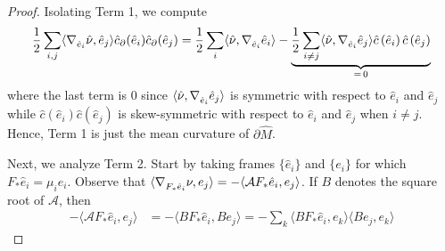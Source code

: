 \documentclass[10pt,a4paper]{amsart}
\newcommand{\bnd}[1]{\partial #1}
\newcommand{\cbar}[1]{\dom{c}\left(#1\right)}
\newcommand{\dom}[1]{\hat{#1}}
\newcommand{\inner}[1]{\langle #1 \rangle}
\begin{document}
\begin{proof}
    Isolating Term 1, we compute
    \begin{equation*}
        \frac{1}{2} \sum_{i, j} \inner{\conn[]_{\dom{e}_i} \dom{\nu}, \dom{e}_j} \dom{c}_\partial(\dom{e}_i) \dom{c}_\partial(\dom{e}_j) = \frac{1}{2} \sum_i \inner{\dom{\nu}, \conn[]_{\dom{e}_i} \dom{e}_i} - \underbrace{\frac{1}{2} \sum_{i \neq j} \inner{\dom{\nu}, \conn[]_{\dom{e}_i} \dom{e}_j} \cbar{\dom{e}_i} \cbar{\dom{e}_j}}_{=\, 0}
    \end{equation*}
    where the last term is 0 since \(\inner{\dom{\nu}, \conn[]_{\dom{e}_i} \dom{e}_j}\) is symmetric with respect to \(\dom{e}_i\) and \(\dom{e}_j\) while \(\cbar{\dom{e}_i} \cbar{\dom{e}_j}\) is skew-symmetric with respect to \(\dom{e}_i\) and \(\dom{e}_j\) when \(i \neq j\).
    Hence, Term 1 is just the mean curvature of \(\bnd{\dom{M}}\).

    Next, we analyze Term 2.
    Start by taking frames \(\{\dom{e}_i\}\) and \(\{e_i\}\) for which \(F_*\dom{e}_i = \mu_i e_i\).
    Observe that \(\inner{\conn[]_{F_*\dom{e}_i} \nu, e_j} = -\inner{\mathcal{A} F_*\dom{e}_i, e_j}\).
    If \(B\) denotes the square root of \(\mathcal{A}\), then
    \begin{align*}
        -\inner{\mathcal{A} F_*\dom{e}_i, e_j} &= -\inner{B F_*\dom{e}_i, B e_j} = -\sum_k \inner{BF_*\dom{e}_i, e_k} \inner{Be_j, e_k}
    \end{align*}


\end{proof}
\end{document}
